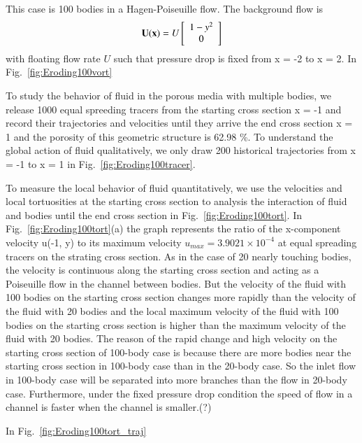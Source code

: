 \documentclass[preprint, 10pt]{elsarticle}
\begin{document}
{\color{red}
This case is 100 bodies in a Hagen-Poiseuille flow. The background
flow is 
\begin{align}
  {\mathbf{U}}({\mathbf{x}})=U \left[
  \begin{array}{c}
    1-y^2 \\ 0
  \end{array}
  \right]
\end{align}
with floating flow rate $U$ such that pressure drop is fixed from x = -2 to x = 2.
In Fig.~\ref{fig:Eroding100vort}

To study the behavior of fluid in the porous media with multiple bodies, 
we release 1000 equal spreeding tracers from the 
starting cross section x = -1 and record their trajectories and velocities
until they arrive the end cross section x = 1 
and the porosity of this geometric structure is 62.98 \%. 
To understand the global action of fluid qualitatively, 
we only draw 200 historical trajectories from x = -1 to x = 1 
in Fig.~\ref{fig:Eroding100tracer}. 

To measure the local behavior of fluid quantitatively, 
we use the velocities and local tortuosities at the starting cross section 
to analysis the interaction of fluid and bodies until the end cross section 
in Fig.~\ref{fig:Eroding100tort}.
In Fig.~\ref{fig:Eroding100tort}(a) the graph represents the ratio of the
x-component velocity u(-1, y) to its maximum velocity $u_{max}=3.9021
\times 10^{-4}$ at equal spreading tracers on the strating cross section.
As in the case of 20 nearly touching bodies, the velocity is continuous along
the starting cross section and acting as a Poiseuille flow in the channel between
bodies. But the velocity of the fluid with 100 bodies on the starting cross section 
changes more rapidly than the velocity of the fluid with 20 bodies 
and the local maximum velocity of the fluid with 100 bodies 
on the starting cross section is higher than the maximum velocity 
of the fluid with 20 bodies. The reason of the rapid change and 
high velocity on the starting cross section of 100-body case is because there are 
more bodies near the starting cross section in
100-body case than in the 20-body case. So the inlet flow in 100-body case
will be separated into more branches than the flow in 20-body case. 
Furthermore, under the fixed pressure drop condition the speed of flow in a channel is faster 
when the channel is smaller.(?)

In Fig.~\ref{fig:Eroding100tort_traj}

}
\end{document}
